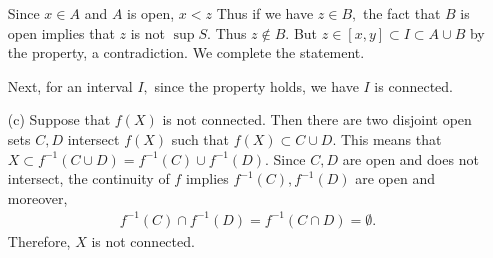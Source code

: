 \begin{problem}
\begin{solution}
\begin{itemize}
    Since $x\in A$ and $A$ is open, $x<z$ Thus if we have $z\in B,$ the fact that $B$ is open implies that $z$ is not $\sup S.$ Thus $z\notin B.$ But $z\in [x,y]\subset I\subset A\cup B$ by the property, a contradiction. We complete the statement.
    
    Next, for an interval $I,$ since the property holds, we have $I$ is connected.
    \item[(c)] Suppose that $f(X)$ is not connected. Then there are two disjoint open sets $C,D$ intersect $f(X)$ such  that $f(X)\subset C\cup D$. This means that $X\subset f^{-1}(C\cup D)=f^{-1}(C)\cup f^{-1}(D)$. Since $C,D$ are open and does not intersect, the continuity of $f$ implies $f^{-1}(C),f^{-1}(D)$ are open and moreover,
    \begin{align*}
        f^{-1}(C)\cap f^{-1}(D)=f^{-1}(C\cap D)=\emptyset.
    \end{align*}
    Therefore, $X$ is not connected.
\end{itemize}
\end{solution}
\end{problem}

